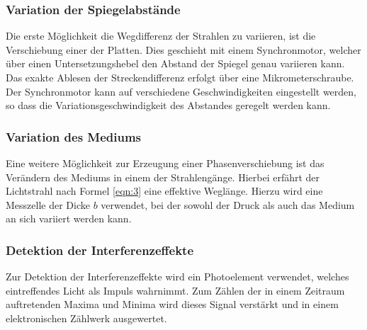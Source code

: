 \subsubsection{Variation der Spiegelabstände}
Die erste Möglichkeit die Wegdifferenz der Strahlen zu variieren, ist die Verschiebung einer der Platten.
Dies geschieht mit einem Synchronmotor, welcher über einen Untersetzungshebel den Abstand der Spiegel genau variieren kann.
Das exakte Ablesen der Streckendifferenz erfolgt über eine Mikrometerschraube.
Der Synchronmotor kann auf verschiedene Geschwindigkeiten eingestellt werden, so dass die Variationsgeschwindigkeit des Abstandes geregelt werden kann.

\subsubsection{Variation des Mediums}
Eine weitere Möglichkeit zur Erzeugung einer Phasenverschiebung ist das Verändern des Mediums in einem der Strahlengänge.
Hierbei erfährt der Lichtstrahl nach Formel \eqref{eqn:3} eine effektive Weglänge.
Hierzu wird eine Messzelle der Dicke $b$ verwendet, bei der sowohl der Druck als auch das Medium an sich variiert werden kann.

\subsubsection{Detektion der Interferenzeffekte}
Zur Detektion der Interferenzeffekte wird ein Photoelement verwendet, welches eintreffendes Licht als Impuls wahrnimmt.
Zum Zählen der in einem Zeitraum auftretenden Maxima und Minima wird dieses Signal verstärkt und in einem elektronischen Zählwerk ausgewertet.
